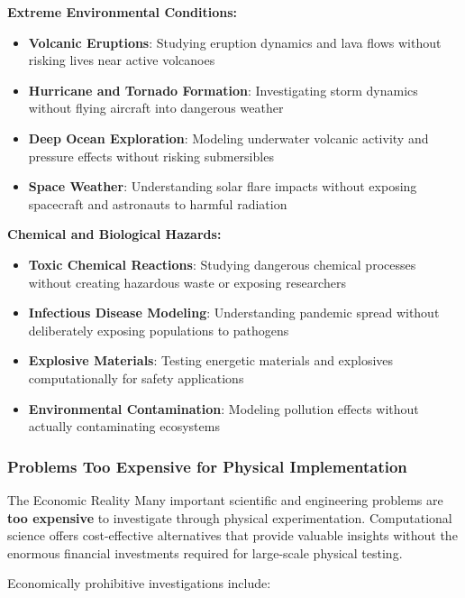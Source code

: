 \textbf{Extreme Environmental Conditions:}
\begin{itemize}
    \item \textbf{Volcanic Eruptions}: Studying eruption dynamics and lava flows without risking lives near active volcanoes
    \item \textbf{Hurricane and Tornado Formation}: Investigating storm dynamics without flying aircraft into dangerous weather
    \item \textbf{Deep Ocean Exploration}: Modeling underwater volcanic activity and pressure effects without risking submersibles
    \item \textbf{Space Weather}: Understanding solar flare impacts without exposing spacecraft and astronauts to harmful radiation
\end{itemize}

\textbf{Chemical and Biological Hazards:}
\begin{itemize}
    \item \textbf{Toxic Chemical Reactions}: Studying dangerous chemical processes without creating hazardous waste or exposing researchers
    \item \textbf{Infectious Disease Modeling}: Understanding pandemic spread without deliberately exposing populations to pathogens
    \item \textbf{Explosive Materials}: Testing energetic materials and explosives computationally for safety applications
    \item \textbf{Environmental Contamination}: Modeling pollution effects without actually contaminating ecosystems
\end{itemize}

\subsubsection{Problems Too Expensive for Physical Implementation}

\begin{warningbox}{The Economic Reality}
Many important scientific and engineering problems are \textbf{too expensive} to investigate through physical experimentation. Computational science offers cost-effective alternatives that provide valuable insights without the enormous financial investments required for large-scale physical testing.
\end{warningbox}

Economically prohibitive investigations include:

